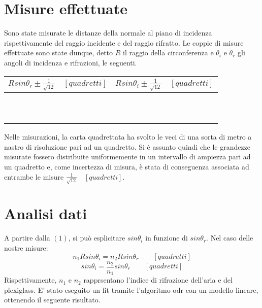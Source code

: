 \documentclass{article}
\begin{document}
	\section{Misure effettuate}
	Sono state misurate le distanze della normale al piano di incidenza rispettivamente del raggio incidente e del raggio rifratto. 
	Le coppie di misure effettuate sono state dunque, detto $R$ il raggio della circonferenza e $\theta_i$ e $\theta_r$ gli angoli di incidenza e rifrazioni, le seguenti.
	\vspace*{1em}
	\begin{center}
	\begin{tabular}{cc}
		\hline
	$Rsin\theta_r \pm \frac{1}{\sqrt{12}}  \quad [quadretti]$ & $Rsin\theta_i \pm \frac{1}{\sqrt{12}} \quad [quadretti]$ \\
		\hline
		&  \\
		&  \\
		&  \\
		&  \\
		&  \\
		&  \\
		&  \\
		&  \\
		&  \\
		&  \\
		\hline
	\end{tabular}
    \end{center}
    \vspace*{1em}
    
    Nelle misurazioni, la carta quadrettata ha svolto le veci di una sorta di metro a nastro di risoluzione pari ad un quadretto. Si è assunto quindi che le grandezze misurate fossero distribuite uniformemente in un intervallo di ampiezza pari ad un quadretto e, come incertezza di misura, è stata di conseguenza associata ad entrambe le misure $\frac{1}{\sqrt{12}} \quad[quadretti]$.
    
	\section{Analisi dati}
	A partire dalla $(1)$, si può esplicitare $sin\theta_i$ in funzione di $sin\theta_r$. Nel caso delle nostre misure:
	\vspace{1em}
	\begin{equation}
		n_1Rsin\theta_i=n_2Rsin\theta_r \quad\quad[quadretti]
	\end{equation}
	\begin{equation}
		sin\theta_i=\frac{n_2}{n_1}sin\theta_r \quad\quad[quadretti]
	\end{equation}
	\vspace{1em}
	Rispettivamente, $n_{1}$ e $n_{2}$ rapprsentano l'indice di rifrazione dell'aria e del plexiglass.
	E' stato eseguito un fit tramite l'algoritmo odr con un modello lineare, ottenendo il seguente risultato. 
	
\end{document}
